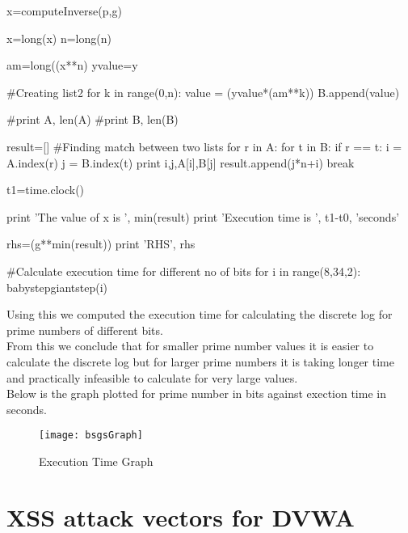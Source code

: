 \documentclass{article}
\begin{document}
\begin{python}
    x=computeInverse(p,g)

    x=long(x)
    n=long(n)

    am=long((x**n) %
    yvalue=y

    #Creating list2
    for k in range(0,n):
        value = (yvalue*(am**k)) %
        B.append(value)

    #print A, len(A)
    #print B, len(B)

    result=[]
    #Finding match between two lists
    for r in A:
        for t in B:
            if r == t:
                i = A.index(r)            
                j = B.index(t)
                print i,j,A[i],B[j]
                result.append(j*n+i)
                break

    t1=time.clock() 
           
    print 'The value of x is ', min(result) 
    print 'Execution time is ', t1-t0, 'seconds' 



    rhs=(g**min(result)) %
    print 'RHS', rhs


#Calculate execution time for different no of bits
for i in range(8,34,2):
    babystepgiantstep(i)
\end{python}

\vspace{70px}
\noindent Using this we computed the execution time for calculating the discrete log for prime numbers of different bits. \\
\noindent From this we conclude that for smaller prime number values it is easier to calculate the discrete log but for larger prime numbers it is taking longer time and practically infeasible to calculate for very large values.\\

\noindent Below is the graph plotted for prime number in bits against exection time in seconds. \\

\begin{figure}[htb]
		\texttt{[image: bsgsGraph]}
		\caption{Execution Time Graph}
\end{figure}



\clearpage
\section*{XSS attack vectors for DVWA}
\end{document}
